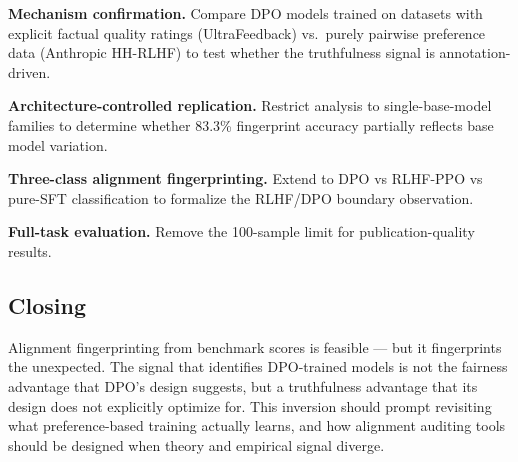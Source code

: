 \textbf{Mechanism confirmation.} Compare DPO models trained on datasets with explicit factual
quality ratings (UltraFeedback) vs.\ purely pairwise preference data (Anthropic HH-RLHF)
to test whether the truthfulness signal is annotation-driven.

\textbf{Architecture-controlled replication.} Restrict analysis to single-base-model families
to determine whether 83.3\% fingerprint accuracy partially reflects base model variation.

\textbf{Three-class alignment fingerprinting.} Extend to DPO vs RLHF-PPO vs pure-SFT
classification to formalize the RLHF/DPO boundary observation.

\textbf{Full-task evaluation.} Remove the 100-sample limit for publication-quality results.

\subsection*{Closing}

Alignment fingerprinting from benchmark scores is feasible --- but it fingerprints the
unexpected. The signal that identifies DPO-trained models is not the fairness advantage
that DPO's design suggests, but a truthfulness advantage that its design does not
explicitly optimize for. This inversion should prompt revisiting what preference-based
training actually learns, and how alignment auditing tools should be designed when
theory and empirical signal diverge.
